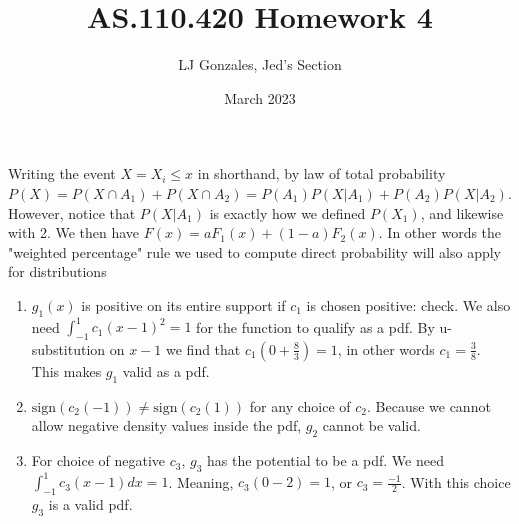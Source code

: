 \documentclass{article}
\title{AS.110.420 Homework 4}
\author{LJ Gonzales, Jed's Section}
\date{March 2023}
\begin{document}
\maketitle

\begin{prob}
	Writing the event $X=X_i \leq x$ in shorthand, by law of total probability $P(X)=P(X \cap A_1)+P(X \cap A_2)=P(A_1)P(X|A_1)+P(A_2)P(X|A_2)$. However, notice that $P(X|A_1)$ is exactly how we defined $P(X_1)$, and likewise with 2.
	We then have $F(x)=aF_1(x)+(1-a)F_2(x)$. In other words the "weighted percentage" rule we used to compute direct probability will also apply for distributions
\end{prob}

\begin{prob}
	\begin{enumerate}
		\item $g_1(x)$ is positive on its entire support if $c_1$ is chosen positive: check.
		We also need $\int_{-1}^{1}c_1(x-1)^2=1$ for the function to qualify as a pdf.
		By u-substitution on $x-1$ we find that $c_1(0+\frac{8}{3})=1$, in other words $c_1=\frac{3}{8}$.
		This makes $g_1$ valid as a pdf.
	\item $\text{sign}(c_2(-1))\neq\text{sign}(c_2(1))$ for any choice of $c_2$.
		Because we cannot allow negative density values inside the pdf, $g_2$ cannot be valid.
	\item For choice of negative $c_3$, $g_3$ has the potential to be a pdf.
		We need $\int_{-1}^{1}c_3(x-1)dx=1$. Meaning, $c_3(0-2)=1$, or $c_3=\frac{-1}{2}$.
		With this choice $g_3$ is a valid pdf.
	\end{enumerate}
\end{prob}
\end{document}
